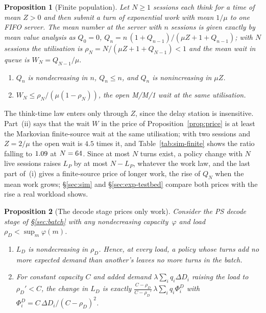\documentclass{article}
\newcommand{\leanref}[1]{}
\newcommand{\provedby}[1]{}
\theoremstyle{plain}
\newtheorem{proposition}{Proposition}
\theoremstyle{definition}
\theoremstyle{remark}
\begin{document}
\begin{proposition}[Finite population]\label{prop:finite}
Let $N\ge1$ sessions each think for a time of mean $Z>0$ and then
submit a turn of exponential work with mean $1/\mu$ to one FIFO server.
The mean number at the server with $n$ sessions is given exactly by
mean value analysis \citep[\S6]{lazowska1984} as $Q_0=0$,
$Q_{n}=n\,(1+Q_{n-1})/(\mu Z+1+Q_{n-1})$; with $N$ sessions the
utilisation is $\rho_N=N/(\mu Z+1+Q_{N-1})<1$ and the mean wait in
queue is $W_N=Q_{N-1}/\mu$.
\begin{enumerate}[nosep,leftmargin=1.6em,label=(\roman*)]
\item $Q_n$ is nondecreasing in $n$, $Q_n\le n$, and $Q_n$ is
  nonincreasing in $\mu Z$.
\item $W_N\le\rho_N/(\mu(1-\rho_N))$, the open M/M/1 wait at the same
  utilisation.
\end{enumerate}
\provedby{\leanref{mvaQ\_mono}, \leanref{mvaQ\_le\_card}, \leanref{mvaQ\_anti\_c}, \leanref{finite\_source\_rho\_lt\_one}, \leanref{finite\_source\_wait\_le\_open}}
\end{proposition}

The think-time law enters only through $Z$, since the delay station
is insensitive. Part~(ii) says that the wait $W$ in the price of
Proposition~\ref{prop:price} is at least the Markovian finite-source
wait at the same utilisation; with two sessions and $Z=2/\mu$ the open wait is $4.5$ times
it,\provedby{\leanref{finite\_source\_two\_sessions\_example}} and
Table~\ref{tab:sim-finite} shows the ratio falling to
$1.09$ at $N=64$. Since at most $N$ turns
exist, a policy change with $N$ live sessions raises $L_P$ by at most
$N-L_P$, whatever the work law,\provedby{\leanref{closed\_price\_cap}}
and the last part of~(i) gives a finite-source price of longer work,
the rise of $Q_N$ when the mean work grows; \S\ref{sec:sim} and
\S\ref{sec:exp-testbed} compare both prices with the rise a real
workload shows.

\begin{proposition}[The decode stage prices only work]\label{prop:decode}
Consider the PS decode stage of \S\ref{sec:batch} with any nondecreasing
capacity~$\varphi$ and load $\rho_D<\sup_m\varphi(m)$.
\begin{enumerate}[nosep,leftmargin=1.6em,label=(\roman*)]
\item $L_D$ is nondecreasing in $\rho_D$. Hence, at every load, a policy
  whose turns add no more expected demand than another's leaves no more
  turns in the batch.
\item For constant capacity $C$ and added demand $\lambda\sum_i q_i\Delta D_i$
  raising the load to $\rho_D'<C$, the change in $L_D$ is exactly
  $\frac{C-\rho_D}{C-\rho_D'}\,\lambda\sum_iq_i\Phi^D_i$ with
  $\Phi^D_i=C\,\Delta D_i/(C-\rho_D)^2$.
\end{enumerate}
\provedby{\leanref{stationaryMean\_mono}, \leanref{ps\_eviction\_rank\_by\_work}, \leanref{psNum\_diff\_exact}, \leanref{psPrice\_lower}, \leanref{psPrice\_upper}, \leanref{psPrice\_unbounded}}
\end{proposition}
\end{document}
